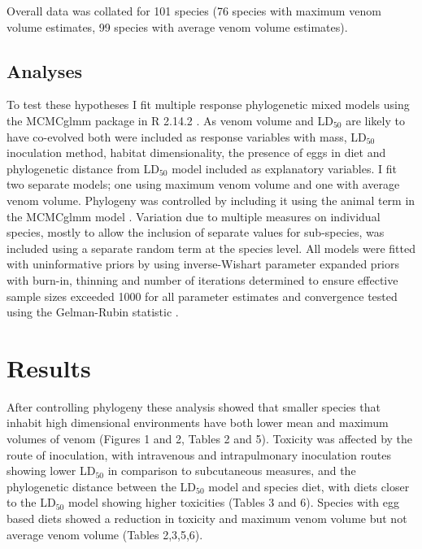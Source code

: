 Overall data was collated for 101 species (76 species with maximum venom volume estimates, 99 species with average venom volume estimates).


\subsection{Analyses}

To test these hypotheses I fit multiple response phylogenetic mixed models using the MCMCglmm package \citep{hadfield2010mcmc} in R 2.14.2 \citep{RCran}. As venom volume and LD$_{50}$ are likely to have co-evolved both were included as response variables with mass, LD$_{50}$ inoculation method, habitat dimensionality, the presence of eggs in diet and phylogenetic distance from LD$_{50}$ model included as explanatory variables. I fit two separate models; one using maximum venom volume and one with average venom volume. Phylogeny was controlled by including it using the animal term in the MCMCglmm model \citep{hadfield2010mcmc}. Variation due to multiple measures on individual species, mostly to allow the inclusion of separate values for sub-species, was included using a separate random term at the species level. All models were fitted with uninformative priors by using inverse-Wishart parameter expanded priors \citep{hadfield2010mcmc} with burn-in, thinning and number of iterations determined to ensure effective sample sizes exceeded 1000 for all parameter estimates and convergence tested using the Gelman-Rubin statistic \citep{gelman1992inference}. 

\section{Results}

After controlling phylogeny these analysis showed that smaller species that inhabit high dimensional environments have both lower mean and maximum volumes of venom (Figures 1 and 2, Tables 2 and 5). Toxicity was affected by the route of inoculation, with intravenous and intrapulmonary inoculation routes showing lower LD$_{50}$ in comparison to subcutaneous measures, and the phylogenetic distance between the LD$_{50}$ model and species diet, with diets closer to the LD$_{50}$ model showing higher toxicities (Tables 3 and 6). Species with egg based diets showed a reduction in toxicity and maximum venom volume but not average venom volume (Tables 2,3,5,6).




